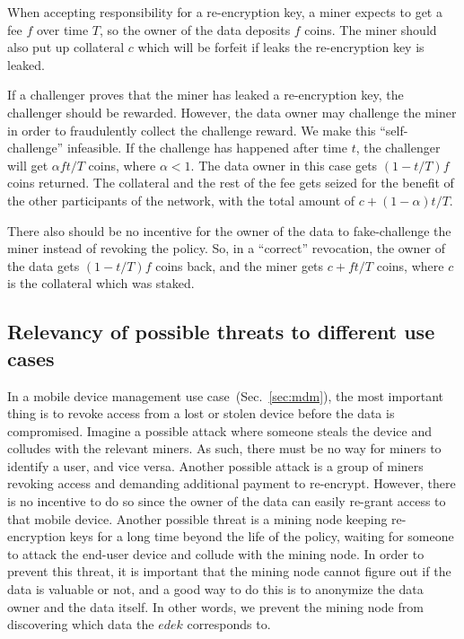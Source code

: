 \documentclass[longbibliography,nofootinbib]{revtex4-1}
\begin{document}
When accepting responsibility for a re-encryption key, a miner expects to get a fee $f$ over time $T$, so the owner of the data deposits $f$ coins.
The miner should also put up collateral $c$ which will be forfeit if leaks the re-encryption key is leaked.

If a challenger proves that the miner has leaked a re-encryption key, the challenger should be rewarded.
However, the data owner may challenge the miner in order to fraudulently collect the challenge reward.
We make this ``self-challenge'' infeasible.
If the challenge has happened after time $t$, the challenger will get
$\alpha f t/T$ coins, where $\alpha < 1$.
The data owner in this case gets $(1 - t/T) f$ coins returned.
The collateral and the rest of the fee gets seized for the benefit of the other participants of the network, with the total amount of $c + (1 - \alpha) t/T$.

There also should be no incentive for the owner of the data to fake-challenge the miner instead of revoking the policy.
So, in a ``correct'' revocation, the owner of the data gets $(1 - t/T) f$ coins back, and the miner gets $c + ft/T$ coins, where $c$ is the collateral which
was staked.


\subsection{Relevancy of possible threats to different use cases}

In a mobile device management use case~(Sec.~\ref{sec:mdm}),
the most important thing is to revoke access from a lost or stolen device before the data is compromised.
Imagine a possible attack where someone steals the device and colludes with the relevant miners.
As such, there must be no way for miners to identify a user, and vice versa.
Another possible attack is a group of miners revoking access and demanding additional payment to re-encrypt.
However, there is no incentive to do so since the owner of the data can easily re-grant access to that mobile device.
Another possible threat is a mining node keeping re-encryption keys for a long time beyond the life of the policy,
waiting for someone to attack the end-user device and collude with the mining node.
In order to prevent this threat, it is important that the mining node cannot figure out if the data is valuable or not,
and a good way to do this is to anonymize the data owner and the data itself.
In other words, we prevent the mining node from discovering which data the $edek$ corresponds to.
\end{document}
